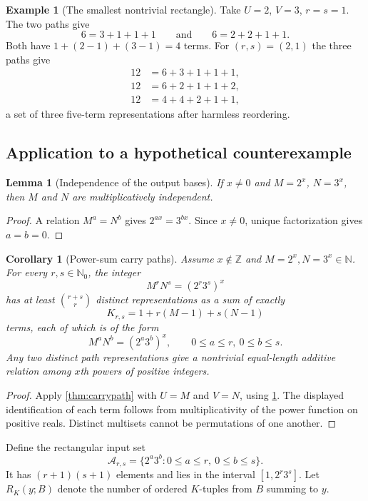 \documentclass[11pt,oneside]{article}
\newtheorem{lemma}[theorem]{Lemma}
\newtheorem{corollary}[theorem]{Corollary}
\theoremstyle{definition}
\newtheorem{example}[theorem]{Example}
\newcommand{\Z}{\mathbb{Z}}
\newcommand{\N}{\mathbb{N}}
\newcommand{\cA}{\mathscr{A}}
\begin{document}
\begin{example}[The smallest nontrivial rectangle]\label{ex:pathsmall}
Take $U=2$, $V=3$, $r=s=1$.  The two paths give
\[
     6=3+1+1+1
     \qquad\text{and}\qquad
     6=2+2+1+1.
\]
Both have $1+(2-1)+(3-1)=4$ terms.  For $(r,s)=(2,1)$ the three paths give
\[
\begin{aligned}
 12&=6+3+1+1+1,\\
 12&=6+2+1+1+2,\\
 12&=4+4+2+1+1,
\end{aligned}
\]
a set of three five-term representations after harmless reordering.
\end{example}

\subsection{Application to a hypothetical counterexample}

\begin{lemma}[Independence of the output bases]\label{lem:MNind}
If $x\ne0$ and $M=2^x$, $N=3^x$, then $M$ and $N$ are multiplicatively independent.
\end{lemma}

\begin{proof}
A relation $M^a=N^b$ gives
$2^{ax}=3^{bx}$.  Since $x\ne0$, unique factorization gives $a=b=0$.
\end{proof}

\begin{corollary}[Power-sum carry paths]\label{cor:powercarrypaths}
Assume $x\notin\Z$ and $M=2^x,N=3^x\in\N$.  For every $r,s\in\N_0$, the integer
\[
       M^rN^s=(2^r3^s)^x
\]
has at least $\binom{r+s}{r}$ distinct representations as a sum of exactly
\[
       K_{r,s}=1+r(M-1)+s(N-1)
\]
terms, each of which is of the form
\[
       M^aN^b=(2^a3^b)^x,
       \qquad 0\le a\le r,\ 0\le b\le s.
\]
Any two distinct path representations give a nontrivial equal-length additive relation among $x$th powers of positive integers.
\end{corollary}

\begin{proof}
Apply \cref{thm:carrypath} with $U=M$ and $V=N$, using \cref{lem:MNind}.  The displayed identification of each term follows from multiplicativity of the power function on positive reals.  Distinct multisets cannot be permutations of one another.
\end{proof}

Define the rectangular input set
\[
       \cA_{r,s}=\{2^a3^b:0\le a\le r,\ 0\le b\le s\}.
\]
It has $(r+1)(s+1)$ elements and lies in the interval
$[1,2^r3^s]$.  Let $R_K(y;B)$ denote the number of ordered $K$-tuples from $B$ summing to $y$.
\end{document}
